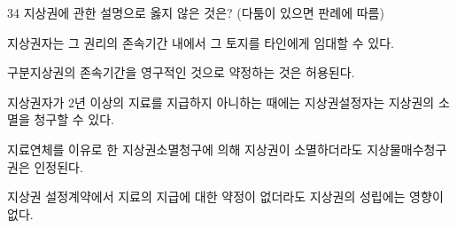 \begin{question}{34}
지상권에 관한 설명으로 옳지 않은 것은? (다툼이 있으면 판례에 따름)
\begin{choices}
  \item 지상권자는 그 권리의 존속기간 내에서 그 토지를 타인에게 임대할 수 있다.
  \item 구분지상권의 존속기간을 영구적인 것으로 약정하는 것은 허용된다.
  \item 지상권자가 2년 이상의 지료를 지급하지 아니하는 때에는 지상권설정자는 지상권의 소멸을 청구할 수 있다.
  \item 지료연체를 이유로 한 지상권소멸청구에 의해 지상권이 소멸하더라도 지상물매수청구권은 인정된다.
  \item 지상권 설정계약에서 지료의 지급에 대한 약정이 없더라도 지상권의 성립에는 영향이 없다.
\end{choices}
\end{question}
